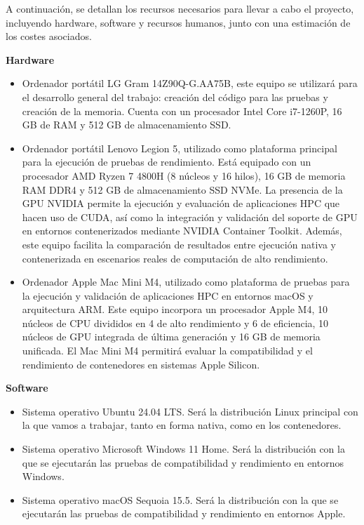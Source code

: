 A continuación, se detallan los recursos necesarios para llevar a cabo el proyecto, incluyendo hardware, software y recursos humanos, junto con una estimación de los costes asociados.

\textbf{Hardware}

\begin{itemize}
      \item Ordenador portátil LG Gram 14Z90Q-G.AA75B, este equipo se utilizará para el desarrollo general del trabajo: creación del código para las pruebas y creación de la memoria. Cuenta con un procesador Intel Core i7-1260P, 16 GB de RAM y 512 GB de almacenamiento SSD.

      \item Ordenador portátil Lenovo Legion 5, utilizado como plataforma principal para la ejecución de pruebas de rendimiento. Está equipado con un procesador AMD Ryzen 7 4800H (8 núcleos y 16 hilos), 16 GB de memoria RAM DDR4 y 512 GB de almacenamiento SSD NVMe. La presencia de la GPU NVIDIA permite la ejecución y evaluación de aplicaciones HPC que hacen uso de CUDA, así como la integración y validación del soporte de GPU en entornos contenerizados mediante NVIDIA Container Toolkit. Además, este equipo facilita la comparación de resultados entre ejecución nativa y contenerizada en escenarios reales de computación de alto rendimiento.

      \item Ordenador Apple Mac Mini M4, utilizado como plataforma de pruebas para la ejecución y validación de aplicaciones HPC en entornos macOS y arquitectura ARM. Este equipo incorpora un procesador Apple M4, 10 núcleos de CPU divididos en 4 de alto rendimiento y 6 de eficiencia, 10 núcleos de GPU integrada de última generación y 16 GB de memoria unificada. El Mac Mini M4 permitirá evaluar la compatibilidad y el rendimiento de contenedores en sistemas Apple Silicon.
\end{itemize}

\textbf{Software}

\begin{itemize}
      \item Sistema operativo Ubuntu 24.04 LTS. Será la distribución Linux principal con la que vamos a trabajar, tanto en forma nativa, como en los contenedores.

      \item Sistema operativo Microsoft Windows 11 Home. Será la distribución con la que se ejecutarán las pruebas de compatibilidad y rendimiento en entornos Windows.

      \item Sistema operativo macOS Sequoia 15.5. Será la distribución con la que se ejecutarán las pruebas de compatibilidad y rendimiento en entornos Apple.
\end{itemize}

